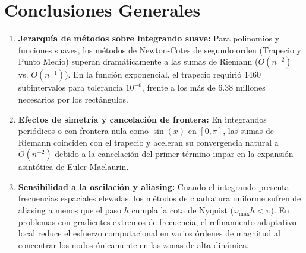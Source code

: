 \documentclass[11pt,a4paper]{article}
\begin{document}
\section{Conclusiones Generales}

\begin{enumerate}[leftmargin=*]
    \item \textbf{Jerarquía de métodos sobre integrando suave:} Para polinomios y funciones suaves, los métodos de Newton-Cotes de segundo orden (Trapecio y Punto Medio) superan dramáticamente a las sumas de Riemann ($O(n^{-2})$ vs. $O(n^{-1})$). En la función exponencial, el trapecio requirió 1460 subintervalos para tolerancia $10^{-6}$, frente a los más de 6.38 millones necesarios por los rectángulos.
    \item \textbf{Efectos de simetría y cancelación de frontera:} En integrandos periódicos o con frontera nula como $\sin(x)$ en $[0, \pi]$, las sumas de Riemann coinciden con el trapecio y aceleran su convergencia natural a $O(n^{-2})$ debido a la cancelación del primer término impar en la expansión asintótica de Euler-Maclaurin.
    \item \textbf{Sensibilidad a la oscilación y aliasing:} Cuando el integrando presenta frecuencias espaciales elevadas, los métodos de cuadratura uniforme sufren de aliasing a menos que el paso $h$ cumpla la cota de Nyquist ($\omega_{\max} h < \pi$). En problemas con gradientes extremos de frecuencia, el refinamiento adaptativo local reduce el esfuerzo computacional en varios órdenes de magnitud al concentrar los nodos únicamente en las zonas de alta dinámica.
\end{enumerate}
\end{document}
